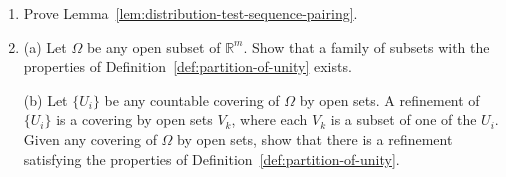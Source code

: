 \begin{enumerate}[label=\thesection.\arabic*.,ref=\thesection.\arabic*,start=1,series=book-problems]
\item\label{ex:distribution-test-sequence-pairing} Prove Lemma~\ref{lem:distribution-test-sequence-pairing}.

\item\label{ex:locally-finite-cover-refinement} (a) Let $\Omega$ be any open subset of $\mathbb{R}^m$. Show that a family of subsets with the properties of Definition~\ref{def:partition-of-unity} exists.

(b) Let $\{U_i\}$ be any countable covering of $\Omega$ by open sets. A refinement of $\{U_i\}$ is a covering by open sets $V_k$, where each $V_k$ is a subset of one of the $U_i$. Given any covering of $\Omega$ by open sets, show that there is a refinement satisfying the properties of Definition~\ref{def:partition-of-unity}.

\end{enumerate}
